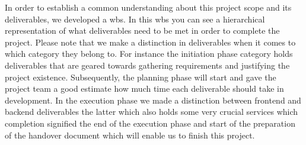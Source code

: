 In order to establish a common understanding about this project scope and its deliverables, we developed a \ac{wbs}.
In this \ac{wbs} you can see a hierarchical representation of what deliverables need to be met in order to complete
the project.
Please note that we make a distinction in deliverables when it comes to which category they belong to.
For instance the initiation phase category holds deliverables that are geared towards gathering requirements and
justifying the project existence.
Subsequently, the planning phase will start and gave the project team a good estimate how much time each deliverable
should take in development.
In the execution phase we made a distinction between frontend and backend deliverables the latter which also holds
some very crucial services which completion signified the end of the execution phase and start of the preparation of
the handover document which will enable us to finish this project.
